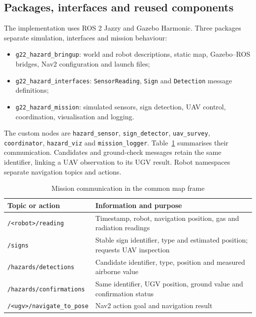 \documentclass[conference]{IEEEtran}
\begin{document}
\subsection{Packages, interfaces and reused components}
The implementation uses ROS 2 Jazzy and Gazebo Harmonic. Three packages separate simulation, interfaces and mission behaviour:
\begin{itemize}
\item \texttt{g22\_hazard\_bringup}: world and robot descriptions, static map, Gazebo--ROS bridges, Nav2 configuration and launch files;
\item \texttt{g22\_hazard\_interfaces}: \texttt{SensorReading}, \texttt{Sign} and \texttt{Detection} message definitions;
\item \texttt{g22\_hazard\_mission}: simulated sensors, sign detection, UAV control, coordination, visualisation and logging.
\end{itemize}

The custom nodes are \texttt{hazard\_sensor}, \texttt{sign\_detector}, \texttt{uav\_survey}, \texttt{coordinator}, \texttt{hazard\_viz} and \texttt{mission\_logger}. Table~\ref{tab:messages} summarises their communication. Candidates and ground-check messages retain the same identifier, linking a UAV observation to its UGV result. Robot namespaces separate navigation topics and actions.

\begin{table}[t]
\caption{Mission communication in the common map frame}
\label{tab:messages}
\centering
\small
\begin{tabular}{@{}p{}p{}@{}}
\toprule
Topic or action & Information and purpose\\
\midrule
\texttt{/<robot>/reading} & Timestamp, robot, navigation position, gas and radiation readings\\
\texttt{/signs} & Stable sign identifier, type and estimated position; requests UAV inspection\\
\texttt{/hazards/detections} & Candidate identifier, type, position and measured airborne value\\
\texttt{/hazards/}\newline\texttt{confirmations} & Same identifier, UGV position, ground value and confirmation status\\
\texttt{/<ugv>/}\newline\texttt{navigate\_to\_pose} & Nav2 action goal and navigation result\\
\bottomrule
\end{tabular}
\end{table}
\end{document}

